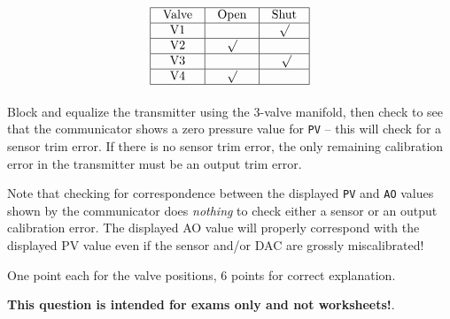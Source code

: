 \vskip 50pt








$$\vbox{\offinterlineskip
\halign{\strut
\vrule \quad\hfil # \ \hfil & 
\vrule \quad\hfil # \ \hfil & 
\vrule \quad\hfil # \ \hfil \vrule \cr
\noalign{\hrule}
%
Valve & Open & Shut \cr
%
\noalign{\hrule}
%
V1 &  & $\surd$ \cr
%
\noalign{\hrule}
%
V2 & $\surd$ &  \cr
%
\noalign{\hrule}
%
V3 &  & $\surd$\cr
%
\noalign{\hrule}
%
V4 & $\surd$ &  \cr
%
\noalign{\hrule}
} %
}$$ %

\vskip 10pt

Block and equalize the transmitter using the 3-valve manifold, then check to see that the communicator shows a zero pressure value for {\tt PV} -- this will check for a sensor trim error.  If there is no sensor trim error, the only remaining calibration error in the transmitter must be an output trim error.

Note that checking for correspondence between the displayed {\tt PV} and {\tt AO} values shown by the communicator does {\it nothing} to check either a sensor or an output calibration error.  The displayed AO value will properly correspond with the displayed PV value even if the sensor and/or DAC are grossly miscalibrated!

\vskip 10pt

One point each for the valve positions, 6 points for correct explanation.







{\bf This question is intended for exams only and not worksheets!}.


